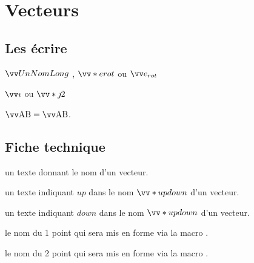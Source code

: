 \documentclass[12pt,a4paper]{article}
\begin{document}
\section{Vecteurs}

\subsection{Les écrire}

\newparaexample{}

\begin{latexex}
$\vect{UnNomLong}$  ,
$\vect*{e}{rot}$ ou
$\vect{e_{rot}}$
\end{latexex}





\begin{latexex}
$\vect{i}$ ou
$\vect*{j}{2}$
\end{latexex}





\begin{latexex}
$\pvect{A}{B} = \vect{\pt{A}\pt{B}}$. 
\end{latexex}




\subsection{Fiche technique}


\IDarg{} un texte donnant le nom d'un vecteur.


\separation



 un texte indiquant $up$ dans le nom $\vect*{up}{down}$ d'un vecteur.

 un texte indiquant $down$ dans le nom $\vect*{up}{down}$ d'un vecteur.


\separation



 le nom du 1\ier{} point qui sera mis en forme via la macro .

 le nom du 2\ieme{} point qui sera mis en forme via la macro .
\end{document}
